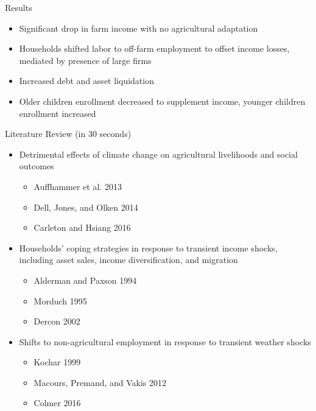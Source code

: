 \documentclass[10pt]{beamer}
\begin{document}
\begin{frame}
	{Results}
	\begin{itemize}
		\item Significant drop in farm income with no agricultural adaptation
		\item Households shifted labor to off-farm employment to offset income losses, mediated by presence of large firms
		\item Increased debt and asset liquidation
		\item Older children enrollment decreased to supplement income, younger children enrollment increased
	\end{itemize}
\end{frame}

\begin{frame}
	{Literature Review (in 30 seconds)}
	\begin{itemize}
		\item Detrimental effects of climate change on agricultural livelihoods and social outcomes
		      \begin{itemize}
			      \item Auffhammer et al. 2013
			      \item Dell, Jones, and Olken 2014
			      \item Carleton and Hsiang 2016
		      \end{itemize}
		\item Households' coping strategies in response to transient income shocks, including asset sales, income diversification, and migration
		      \begin{itemize}
			      \item Alderman and Paxson 1994
			      \item Morduch 1995
			      \item Dercon 2002
		      \end{itemize}
		\item Shifts to non-agricultural employment in response to transient weather shocks
		      \begin{itemize}
			      \item Kochar 1999
			      \item Macours, Premand, and Vakis 2012
			      \item Colmer 2016
		      \end{itemize}
	\end{itemize}
\end{frame}
\end{document}
